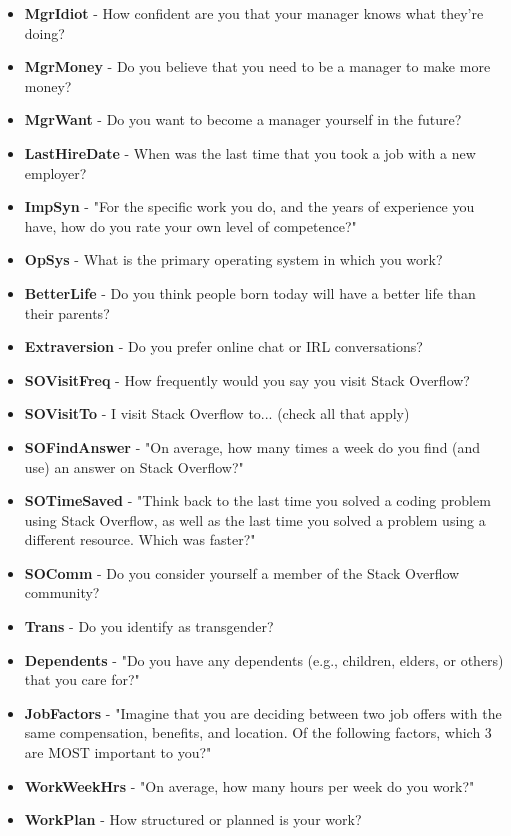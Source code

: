 \begin{appendices}
\begin{itemize}
        \item \textbf{MgrIdiot} - How confident are you that your manager knows what they’re doing?
        \item \textbf{MgrMoney} - Do you believe that you need to be a manager to make more money?
        \item \textbf{MgrWant} - Do you want to become a manager yourself in the future?
        \item \textbf{LastHireDate} - When was the last time that you took a job with a new employer?
        \item \textbf{ImpSyn} - "For the specific work you do, and the years of experience you have, how do you rate your own level of competence?"
        \item \textbf{OpSys} - What is the primary operating system in which you work?
        \item \textbf{BetterLife} - Do you think people born today will have a better life than their parents?
        \item \textbf{Extraversion} - Do you prefer online chat or IRL conversations?
        \item \textbf{SOVisitFreq} - How frequently would you say you visit Stack Overflow?
        \item \textbf{SOVisitTo} - I visit Stack Overflow to... (check all that apply)
        \item \textbf{SOFindAnswer} - "On average, how many times a week do you find (and use) an answer on Stack Overflow?"
        \item \textbf{SOTimeSaved} - "Think back to the last time you solved a coding problem using Stack Overflow, as well as the last time you solved a problem using a different resource. Which was faster?"
        \item \textbf{SOComm} - Do you consider yourself a member of the Stack Overflow community?
        \item \textbf{Trans} - Do you identify as transgender?
        \item \textbf{Dependents} - "Do you have any dependents (e.g., children, elders, or others) that you care for?"
        \item \textbf{JobFactors} - "Imagine that you are deciding between two job offers with the same compensation, benefits, and location. Of the following factors, which 3 are MOST important to you?"
        \item \textbf{WorkWeekHrs} - "On average, how many hours per week do you work?"
        \item \textbf{WorkPlan} - How structured or planned is your work?

\end{itemize}
\end{appendices}
